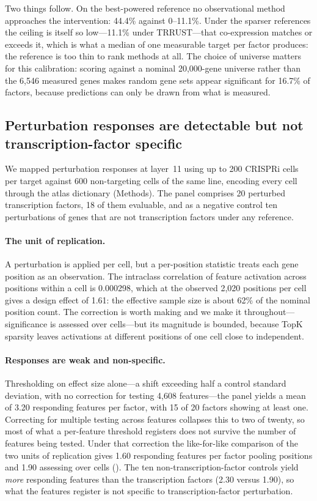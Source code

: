 Two things follow. On the best-powered reference no observational method approaches the
intervention: 44.4\% against 0--11.1\%. Under the sparser references the ceiling is itself so
low---11.1\% under TRRUST---that co-expression matches or exceeds it, which is what a median of one
measurable target per factor produces: the reference is too thin to rank methods at all.
The choice of universe matters for this calibration: scoring against a nominal 20,000-gene universe
rather than the 6,546 measured genes makes random gene sets appear significant for 16.7\% of
factors, because predictions can only be drawn from what is measured.

\subsection*{Perturbation responses are detectable but not transcription-factor specific}
\label{sec:perturbation}

We mapped perturbation responses at layer~11 using up to 200 CRISPRi cells per target against 600
non-targeting cells of the same line, encoding every cell through the atlas dictionary (Methods).
The panel comprises 20 perturbed transcription factors, 18 of them evaluable, and as a
negative control ten
perturbations of genes that are not transcription factors under any reference.

\paragraph{The unit of replication.} A perturbation is applied per cell, but a per-position
statistic treats each gene position as an observation. The intraclass correlation of feature
activation across positions within a cell is 0.000298, which at the observed 2,020 positions per
cell gives a design effect of 1.61: the effective sample size is about 62\% of the nominal position
count. The correction is worth making and we make it throughout---significance is assessed over
cells---but its magnitude is bounded, because TopK sparsity leaves activations at different
positions of one cell close to independent.

\paragraph{Responses are weak and non-specific.} Thresholding on effect size alone---a shift
exceeding half a control standard deviation, with no correction for testing 4,608 features---the
panel yields a mean of 3.20 responding features per factor, with 15 of 20 factors showing at least
one. Correcting for multiple testing across features collapses this to two of twenty, so most of
what a per-feature threshold registers does not survive the number of features being tested. Under
that correction the like-for-like comparison of the two units of replication gives 1.60 responding
features per factor pooling positions and 1.90 assessing over cells (). The ten non-transcription-factor controls yield
\emph{more} responding features than the transcription factors (2.30 versus 1.90), so what the
features register is not specific to transcription-factor perturbation.

